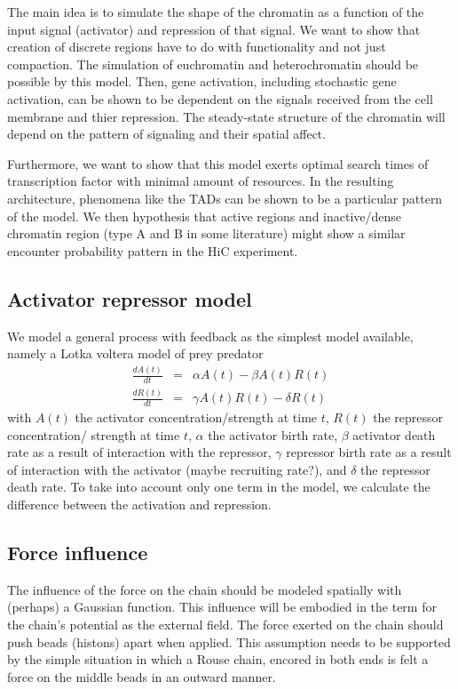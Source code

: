 \documentclass[12pt]{paper}
\begin{document}
The main idea is to simulate the shape of the chromatin as a function of the input signal (activator) and repression of that signal. We want to show that creation of discrete regions have to do with functionality and not just compaction. The simulation of euchromatin and heterochromatin should be possible by this model. Then, gene activation, including stochastic gene activation, can be shown to be dependent on the signals received from the cell membrane and thier repression. The steady-state structure of the chromatin will depend on the pattern of signaling and their spatial affect. 

Furthermore, we want to show that this model exerts optimal search times of transcription factor with minimal amount of resources. In the resulting architecture, phenomena like the TADs can be shown to be a particular pattern of the model. We then hypothesis that active regions and inactive/dense chromatin region (type A and B in some literature) might show a similar encounter probability pattern in the HiC experiment.


\subsection{Activator repressor model}
We model a general process with feedback as the simplest model available, namely a Lotka voltera model of prey predator 
\begin{eqnarray}
\frac{dA(t)}{dt} &=& \alpha A(t)- \beta A(t)R(t)\\
\frac{dR(t)}{dt} &=& \gamma A(t)R(t)-\delta R(t)
\end{eqnarray}
with $A(t)$ the activator concentration/strength at time $t$, $R(t)$ the repressor concentration/ strength at time $t$, $\alpha$ the activator birth rate, $\beta$ activator death rate as a result of interaction with the repressor, $\gamma$ repressor birth rate as a result of interaction with the activator (maybe recruiting rate?), and $\delta$ the repressor death rate.
To take into account only one term in the model, we calculate the difference between the activation and repression. 

\subsection{Force influence}
The influence of the force on the chain should be modeled spatially with (perhaps) a Gaussian function. This influence will be embodied in the term for the chain's potential as the external field.  The force exerted on the chain should push beads (histons) apart when applied. This assumption needs to be supported by the simple situation in which a Rouse chain, encored in both ends is felt a force on the middle beads in an outward manner. 
\end{document}
